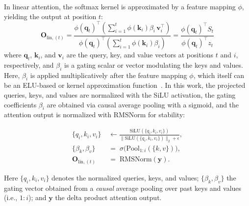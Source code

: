 \documentclass[10pt,a4paper]{article}
\begin{document}
In linear attention, the softmax kernel is approximated by a feature mapping $\phi$, yielding the output at position $t$:
\begin{equation}
\mathbf{O}_{\text{lin}, (t)} = 
\frac{
\phi(\mathbf{q}_t)^\top \left( \sum_{i=1}^t \phi(\mathbf{k}_i) \beta_i\, \mathbf{v}_i^\top \right)}{
\phi(\mathbf{q}_t)^\top \left( \sum_{i=1}^t \phi(\mathbf{k}_i) \beta_i \right)} 
= \frac{\phi(\mathbf{q}_t)^\top S_t}{\phi(\mathbf{q}_t)^\top z_t}
\end{equation}
where $\mathbf{q}_t$, $\mathbf{k}_i$, and $\mathbf{v}_i$ are the query, key, and value vectors at positions $t$ and $i$, respectively, and $\beta_i$ is a gating scalar or vector modulating the keys and values. Here, $\beta_i$ is applied multiplicatively after the feature mapping $\phi$, which itself can be an ELU-based or kernel approximation function~\cite{wang2020linformer}. In this work, the projected queries, keys, and values are normalized with 
the SiLU activation, the gating coefficients $\beta_i$ are obtained via causal average pooling with a sigmoid, and the attention output is normalized with RMSNorm for stability:

\begin{align}
    \{q_i,k_i,v_i\} &\;\leftarrow \frac{\mathrm{SiLU}(\{q_i,k_i,v_i\})}{\|\mathrm{SiLU}(\{q_i,k_i,v_i\})\|_2 + \epsilon}, \\
    \{\beta_k, \beta_v\} &\;=\; \sigma\!\big(\mathrm{Pool}_{1:i}(\{k, v\})\big), \\
    \mathbf{O}_{\text{lin}, (t)}  &\;=\; \mathrm{RMSNorm}(\mathbf{y}) .
\end{align}

Here $\{q_i,k_i,v_i\}$ denotes the normalized queries, keys, and values; $\{\beta_k, \beta_v\}$ the gating vector obtained from a \emph{causal} average pooling over past keys and values (i.e., $1{:}i$); and $\mathbf{y}$ the delta product attention output.

\end{document}
